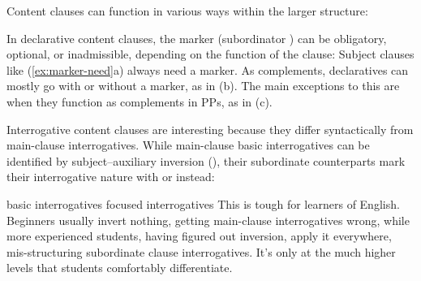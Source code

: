 Content clauses can function in various ways within the larger structure:

\ea \label{ex:content-funcs}
    \z
\z
{}

In declarative content clauses, the marker (subordinator ) can be obligatory, optional, or inadmissible, depending on the function of the clause:
\ea\label{ex:marker-need}
\z\z
Subject clauses like (\ref{ex:marker-need}a) always need a marker. As complements, declaratives can mostly go with or without a marker, as in (b). The main exceptions to this are when they function as complements in PPs, as in (c).


\label{sec:sub-interrog}

Interrogative content clauses are interesting because they differ syntactically from main-clause interrogatives. While main-clause basic interrogatives can be identified by subject--auxiliary inversion (), their subordinate counterparts mark their interrogative nature with  or  instead:

\ea basic interrogatives\label{ex:int-sub}
    \z
\z
\ea focused interrogatives
    \z
\z
This is tough for learners of English. Beginners usually invert nothing, getting main-clause interrogatives wrong, while more experienced students, having figured out inversion, apply it everywhere, mis-structuring subordinate clause interrogatives. It's only at the much higher levels that students comfortably differentiate.

